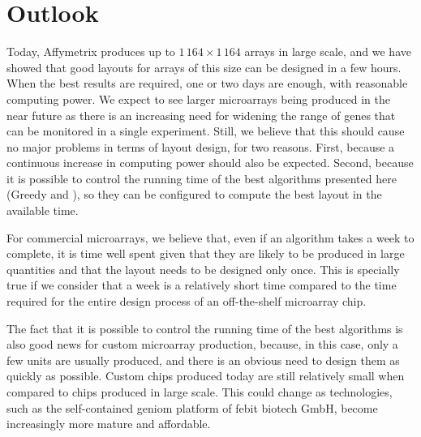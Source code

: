\section{Outlook}
\label{sec:discuss_outlook}

Today, Affymetrix produces up to $1\,164\times 1\,164$ arrays in large scale,
and we have showed that good layouts for arrays of this size can be designed in
a few hours. When the best results are required, one or two days are enough,
with reasonable computing power. We expect to see larger microarrays being
produced in the near future as there is an increasing need for widening the
range of genes that can be monitored in a single experiment. Still, we believe
that this should cause no major problems in terms of layout design, for two
reasons. First, because a continuous increase in computing power should also be
expected. Second, because it is possible to control the running time of the best
algorithms presented here (Greedy and \Greedyplus), so they can be configured to
compute the best layout in the available time. 

For commercial microarrays, we believe that, even if an algorithm takes a week
to complete, it is time well spent given that they are likely to be produced in
large quantities and that the layout needs to be designed only once. This is
specially true if we consider that a week is a relatively short time compared to
the time required for the entire design process of an off-the-shelf
microarray chip.

The fact that it is possible to control the running time of the best algorithms
is also good news for custom microarray production, because, in this case, only
a few units are usually produced, and there is an obvious need to design them as
quickly as possible. Custom chips produced today are still relatively small when
compared to chips produced in large scale. This could change as
technologies, such as the self-contained {\sffamily geniom} platform of febit
biotech GmbH, become increasingly more mature and affordable.
